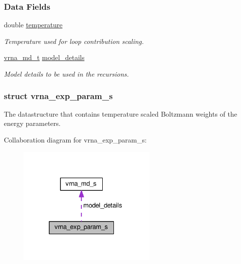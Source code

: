 \subsubsection*{Data Fields}
\begin{DoxyCompactItemize}
\item 
double \hyperlink{group__energy__parameters_aeed2cd83713012bcb52e431041e037c8}{temperature}\hypertarget{group__energy__parameters_aeed2cd83713012bcb52e431041e037c8}{}\label{group__energy__parameters_aeed2cd83713012bcb52e431041e037c8}

\begin{DoxyCompactList}\small\item\em Temperature used for loop contribution scaling. \end{DoxyCompactList}\item 
\hyperlink{group__model__details_ga1f8a10e12a0a1915f2a4eff0b28ea17c}{vrna\+\_\+md\+\_\+t} \hyperlink{group__energy__parameters_a7b84353eb9075c595bad4ceb871bcae7}{model\+\_\+details}\hypertarget{group__energy__parameters_a7b84353eb9075c595bad4ceb871bcae7}{}\label{group__energy__parameters_a7b84353eb9075c595bad4ceb871bcae7}

\begin{DoxyCompactList}\small\item\em Model details to be used in the recursions. \end{DoxyCompactList}\end{DoxyCompactItemize}
\label{structvrna__exp__param__s}
\hypertarget{group__energy__parameters_structvrna__exp__param__s}{}
\subsubsection{struct vrna\+\_\+exp\+\_\+param\+\_\+s}
The datastructure that contains temperature scaled Boltzmann weights of the energy parameters. 

Collaboration diagram for vrna\+\_\+exp\+\_\+param\+\_\+s\+:
\nopagebreak
\begin{figure}[H]
\begin{center}
\leavevmode
\includegraphics[width=194pt]{structvrna__exp__param__s__coll__graph}
\end{center}
\end{figure}
